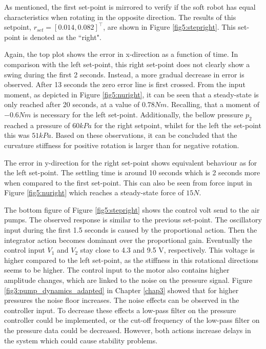 As mentioned, the first set-point is mirrored to verify if the soft robot has equal characteristics when rotating in the opposite direction. The results of this setpoint, $r_{set} = [0.014,0.082]^\top$, are shown in Figure \ref{fig5:stepright}. This set-point is denoted as the ``right".


Again, the top plot shows the error in x-direction as a function of time. In comparison with the left set-point, this right set-point does not clearly show a swing during the first 2 seconds. Instead, a more gradual decrease in error is observed. After 13 seconds the zero error line is first crossed. From the input moment, as depicted in Figure \ref{fig5:nuright}, it can be seen that a steady-state is only reached after 20 seconds, at a value of $0.78 Nm$. Recalling, that a moment of $-0.6 Nm$ is necessary for the left set-point. Additionally, the bellow pressure $p_2$ reached a pressure of $60 kPa$ for the right setpoint, whilst for the left the set-point this was $51 kPa$. Based on these observations, it can be concluded that the curvature stiffness for positive rotation is larger than for negative rotation.

The error in y-direction for the right set-point shows equivalent behaviour as for the left set-point. The settling time is around 10 seconds which is 2 seconds more when compared to the first set-point. This can also be seen from force input in Figure \ref{fig5:nuright} which reaches a steady-state force of $15 N$.

The bottom figure of Figure \ref{fig5:stepright} shows the control volt send to the air pumps. The observed response is similar 
to the previous set-point. The oscillatory input during the first 1.5 seconds is caused by the proportional action. Then the integrator action becomes dominant over the proportional gain. Eventually the control input $V_1$ and $V_2$ stay close to 4.3 and 9.5 V, respectively. This voltage is higher compared to the left set-point, as the stiffness in this rotational directions seems to be higher. The control input to the motor also contains higher amplitude changes, which are linked to the noise on the pressure signal. Figure \ref{fig3:pump_dynamics_adapted} in Chapter \ref{chap3} showed that for higher pressures the noise floor increases. The noise effects can be observed in the controller input. To decrease these effects a low-pass filter on the pressure controller could be implemented, or the cut-off frequency of the low-pass filter on the pressure data could be decreased. However, both actions increase delays in the system which could cause stability problems.

